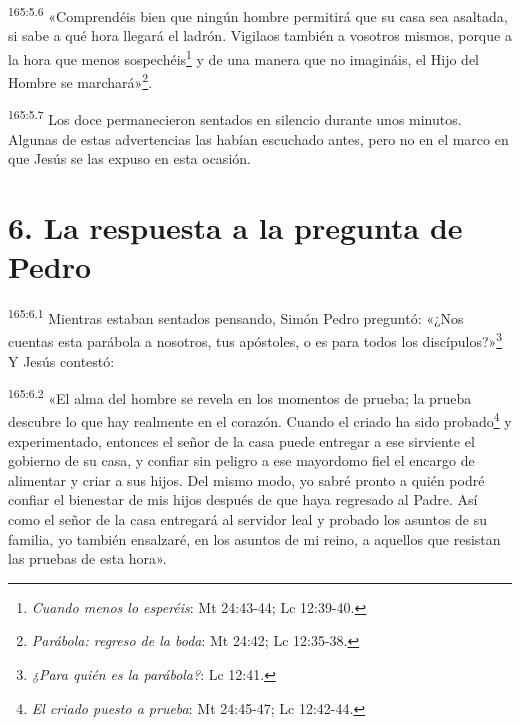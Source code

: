 \par 
\textsuperscript{165:5.6} «Comprendéis bien que ningún hombre permitirá que su casa sea asaltada, si sabe a qué hora llegará el ladrón. Vigilaos también a vosotros mismos, porque a la hora que menos sospechéis\footnote{\textit{Cuando menos lo esperéis}: Mt 24:43-44; Lc 12:39-40.} y de una manera que no imagináis, el Hijo del Hombre se marchará»\footnote{\textit{Parábola: regreso de la boda}: Mt 24:42; Lc 12:35-38.}.

\par 
\textsuperscript{165:5.7} Los doce permanecieron sentados en silencio durante unos minutos. Algunas de estas advertencias las habían escuchado antes, pero no en el marco en que Jesús se las expuso en esta ocasión.

\section*{6. La respuesta a la pregunta de Pedro}
\par 
\textsuperscript{165:6.1} Mientras estaban sentados pensando, Simón Pedro preguntó: «¿Nos cuentas esta parábola a nosotros, tus apóstoles, o es para todos los discípulos?»\footnote{\textit{¿Para quién es la parábola?}: Lc 12:41.} Y Jesús contestó:

\par 
\textsuperscript{165:6.2} «El alma del hombre se revela en los momentos de prueba; la prueba descubre lo que hay realmente en el corazón. Cuando el criado ha sido probado\footnote{\textit{El criado puesto a prueba}: Mt 24:45-47; Lc 12:42-44.} y experimentado, entonces el señor de la casa puede entregar a ese sirviente el gobierno de su casa, y confiar sin peligro a ese mayordomo fiel el encargo de alimentar y criar a sus hijos. Del mismo modo, yo sabré pronto a quién podré confiar el bienestar de mis hijos después de que haya regresado al Padre. Así como el señor de la casa entregará al servidor leal y probado los asuntos de su familia, yo también ensalzaré, en los asuntos de mi reino, a aquellos que resistan las pruebas de esta hora».

